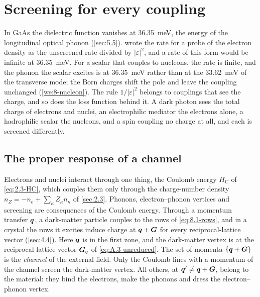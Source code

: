 \section{Screening for every coupling}\label{sec:8.4}

In GaAs the dielectric function vanishes at \SI{36.35}{meV}, the energy of the longitudinal optical phonon (\cref{sec:5.5}).  wrote the rate for a probe of the electron density as the unscreened rate divided by $|\varepsilon|^2$, and a rate of this form would be infinite at \SI{36.35}{meV}. For a scalar that couples to nucleons, the rate is finite, and the phonon the scalar excites is at \SI{36.35}{meV} rather than at the \SI{33.62}{meV} of the transverse mode; the Born charges shift the pole and leave the coupling unchanged (\cref{we:8-nucleon}). The rule $1/|\varepsilon|^2$ belongs to couplings that see the charge, and so does the loss function behind it. A dark photon sees the total charge of electrons and nuclei, an electrophilic mediator the electrons alone, a hadrophilic scalar the nucleons, and a spin coupling no charge at all, and each is screened differently.

\subsection{The proper response of a channel}\label{sec:8.4-proper}

Electrons and nuclei interact through one thing, the Coulomb energy $H_{\mathrm{C}}$ of \cref{eq:2.3-HC}, which couples them only through the charge-number density $n_Z = -n_e + \sum_\kappa Z_\kappa n_\kappa$ of \cref{sec:2.3}. Phonons, electron--phonon vertices and screening are consequences of the Coulomb energy. Through a momentum transfer $\bm{q}$, a dark-matter particle couples to the rows of \cref{eq:8.1-rows}, and in a crystal the rows it excites induce charge at $\bm{q} + \bm{G}$ for every reciprocal-lattice vector (\cref{sec:4.4}). Here $\bm{q}$ is in the first zone, and the dark-matter vertex is at the reciprocal-lattice vector $\bm{G}_q$ of \cref{eq:A.3-unreduced}. The set of momenta $\{\bm{q} + \bm{G}\}$ is the \emph{channel} of the external field. Only the Coulomb lines with a momentum of the channel screen the dark-matter vertex. All others, at $\bm{q}' \ne \bm{q} + \bm{G}$, belong to the material: they bind the electrons, make the phonons and dress the electron--phonon vertex.


